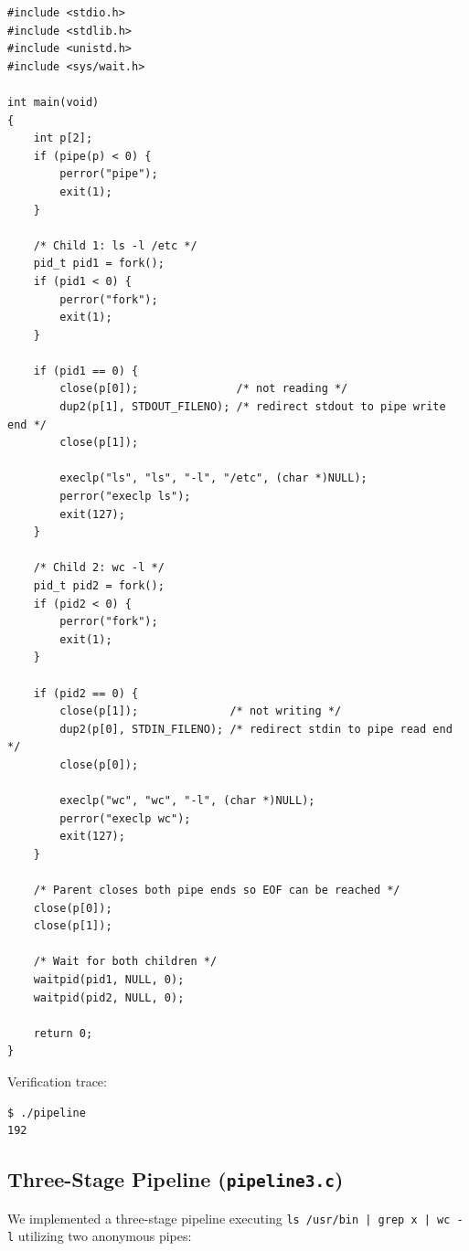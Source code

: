 \documentclass[12pt,a4paper]{article}
\begin{document}
\begin{lstlisting}[style=cstyle]
#include <stdio.h>
#include <stdlib.h>
#include <unistd.h>
#include <sys/wait.h>

int main(void)
{
    int p[2];
    if (pipe(p) < 0) {
        perror("pipe");
        exit(1);
    }

    /* Child 1: ls -l /etc */
    pid_t pid1 = fork();
    if (pid1 < 0) {
        perror("fork");
        exit(1);
    }

    if (pid1 == 0) {
        close(p[0]);               /* not reading */
        dup2(p[1], STDOUT_FILENO); /* redirect stdout to pipe write end */
        close(p[1]);

        execlp("ls", "ls", "-l", "/etc", (char *)NULL);
        perror("execlp ls");
        exit(127);
    }

    /* Child 2: wc -l */
    pid_t pid2 = fork();
    if (pid2 < 0) {
        perror("fork");
        exit(1);
    }

    if (pid2 == 0) {
        close(p[1]);              /* not writing */
        dup2(p[0], STDIN_FILENO); /* redirect stdin to pipe read end */
        close(p[0]);

        execlp("wc", "wc", "-l", (char *)NULL);
        perror("execlp wc");
        exit(127);
    }

    /* Parent closes both pipe ends so EOF can be reached */
    close(p[0]);
    close(p[1]);

    /* Wait for both children */
    waitpid(pid1, NULL, 0);
    waitpid(pid2, NULL, 0);

    return 0;
}
\end{lstlisting}

Verification trace:
\begin{lstlisting}[style=consolestyle]
$ ./pipeline
192
\end{lstlisting}

\subsection{Three-Stage Pipeline (\texttt{pipeline3.c})}
We implemented a three-stage pipeline executing \texttt{ls /usr/bin | grep x | wc -l} utilizing two anonymous pipes:
\end{document}
